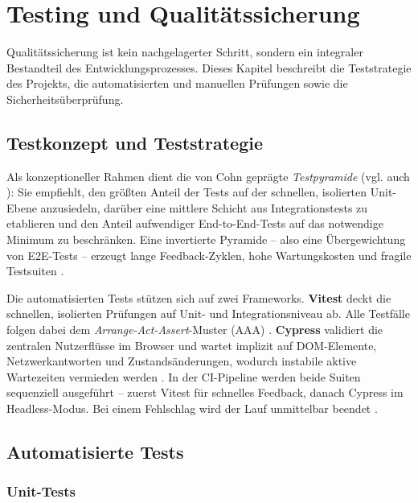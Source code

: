 \chapter{Testing und Qualitätssicherung}
\label{ch:testing}

Qualitätssicherung ist kein nachgelagerter Schritt, sondern ein integraler Bestandteil des Entwicklungsprozesses. Dieses Kapitel beschreibt die Teststrategie des Projekts, die automatisierten und manuellen Prüfungen sowie die Sicherheitsüberprüfung.

\section{Testkonzept und Teststrategie}
\label{sec:testkonzept}

Als konzeptioneller Rahmen dient die von Cohn geprägte \textit{Testpyramide} \cite{contan2018} (vgl. auch \cite{kralik2025}): Sie empfiehlt, den größten Anteil der Tests auf der schnellen, isolierten Unit-Ebene anzusiedeln, darüber eine mittlere Schicht aus Integrationstests zu etablieren und den Anteil aufwendiger End-to-End-Tests auf das notwendige Minimum zu beschränken. Eine invertierte Pyramide -- also eine Übergewichtung von E2E-Tests -- erzeugt lange Feedback-Zyklen, hohe Wartungskosten und fragile Testsuiten \cite{kralik2025, vieira2025}.

Die automatisierten Tests stützen sich auf zwei Frameworks. \textbf{Vitest} deckt die schnellen, isolierten Prüfungen auf Unit- und Integrationsniveau ab. Alle Testfälle folgen dabei dem \textit{Arrange-Act-Assert}-Muster (AAA) \cite{vitest2025, osherove2024}. \textbf{Cypress} validiert die zentralen Nutzerflüsse im Browser und wartet implizit auf DOM-Elemente, Netzwerkantworten und Zustandsänderungen, wodurch instabile aktive Wartezeiten vermieden werden \cite{mwaura2021, cypress2025}. In der CI-Pipeline werden beide Suiten sequenziell ausgeführt -- zuerst Vitest für schnelles Feedback, danach Cypress im Headless-Modus. Bei einem Fehlschlag wird der Lauf unmittelbar beendet \cite{vieira2025}.

\section{Automatisierte Tests}

\subsection{Unit-Tests}
\label{sec:unit-tests}

